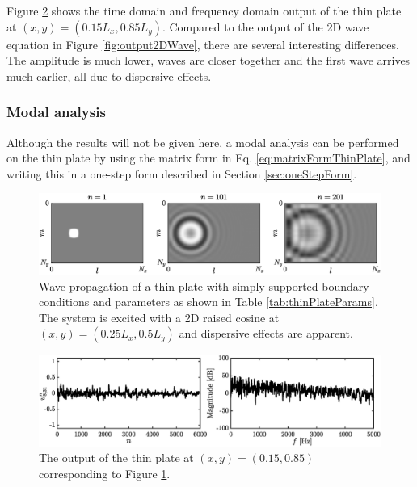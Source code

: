 {\renewcommand{\arraystretch}{1}

Figure \ref{fig:outputThinPlate} shows the time domain and frequency domain output of the thin plate at $(x,y) = (0.15L_x, 0.85 L_y)$.
Compared to the output of the 2D wave equation in Figure \ref{fig:output2DWave}, there are several interesting differences. The amplitude is much lower, waves are closer together and the first wave arrives much earlier, all due to dispersive effects.

\subsubsection{Modal analysis}
Although the results will not be given here, a modal analysis can be performed on the thin plate by using the matrix form in Eq. \eqref{eq:matrixFormThinPlate}, and writing this in a one-step form described in Section \ref{sec:oneStepForm}.

\begin{figure}[h]
    \centering
    \includegraphics[width = \textwidth]{figures/resonators/2d/thinPlatePropagation.eps}
    \caption{Wave propagation of a thin plate with simply supported boundary conditions and parameters as shown in Table \ref{tab:thinPlateParams}. The system is excited with a 2D raised cosine at $(x,y) = (0.25L_x, 0.5L_y)$ and dispersive effects are apparent.\label{fig:thinPlatePropagation}}
\end{figure}

\begin{figure}[h]
    \centering
    \includegraphics[width=\textwidth]{figures/resonators/2d/outputThinPlate.eps}
    \caption{The output of the thin plate at $(x,y) = (0.15, 0.85)$ corresponding to Figure \ref{fig:thinPlatePropagation}. \label{fig:outputThinPlate}}
\end{figure}

}
